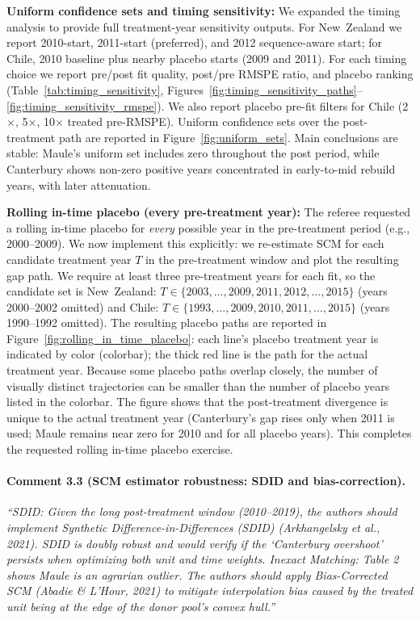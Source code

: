 \textbf{Uniform confidence sets and timing sensitivity:} We expanded the timing analysis to provide full treatment-year sensitivity outputs. For New~Zealand we report 2010-start, 2011-start (preferred), and 2012 sequence-aware start; for Chile, 2010 baseline plus nearby placebo starts (2009 and 2011). For each timing choice we report pre/post fit quality, post/pre RMSPE ratio, and placebo ranking (Table~\ref{tab:timing_sensitivity}, Figures~\ref{fig:timing_sensitivity_paths}--\ref{fig:timing_sensitivity_rmspe}). We also report placebo pre-fit filters for Chile (2$\times$, 5$\times$, 10$\times$ treated pre-RMSPE). Uniform confidence sets over the post-treatment path are reported in Figure~\ref{fig:uniform_sets}. Main conclusions are stable: Maule's uniform set includes zero throughout the post period, while Canterbury shows non-zero positive years concentrated in early-to-mid rebuild years, with later attenuation.

\textbf{Rolling in-time placebo (every pre-treatment year):} The referee requested a rolling in-time placebo for \emph{every} possible year in the pre-treatment period (e.g., 2000--2009). We now implement this explicitly: we re-estimate SCM for each candidate treatment year $T$ in the pre-treatment window and plot the resulting gap path. We require at least three pre-treatment years for each fit, so the candidate set is New~Zealand: $T \in \{2003,\ldots,2009, 2011, 2012,\ldots,2015\}$ (years 2000--2002 omitted) and Chile: $T \in \{1993,\ldots,2009, 2010, 2011,\ldots,2015\}$ (years 1990--1992 omitted). The resulting placebo paths are reported in Figure~\ref{fig:rolling_in_time_placebo}: each line's placebo treatment year is indicated by color (colorbar); the thick red line is the path for the actual treatment year. Because some placebo paths overlap closely, the number of visually distinct trajectories can be smaller than the number of placebo years listed in the colorbar. The figure shows that the post-treatment divergence is unique to the actual treatment year (Canterbury's gap rises only when 2011 is used; Maule remains near zero for 2010 and for all placebo years). This completes the requested rolling in-time placebo exercise.

\paragraph{Comment 3.3 (SCM estimator robustness: SDID and bias-correction).}
\textit{``SDID: Given the long post-treatment window (2010--2019), the authors should implement Synthetic Difference-in-Differences (SDID) (Arkhangelsky et al., 2021). SDID is doubly robust and would verify if the `Canterbury overshoot' persists when optimizing both unit and time weights. Inexact Matching: Table 2 shows Maule is an agrarian outlier. The authors should apply Bias-Corrected SCM (Abadie \& L'Hour, 2021) to mitigate interpolation bias caused by the treated unit being at the edge of the donor pool's convex hull.''}


